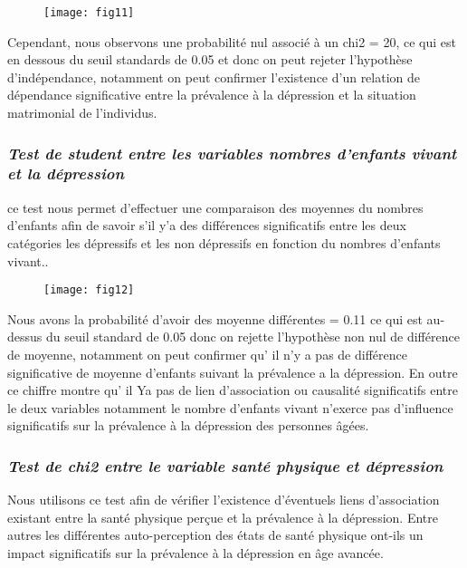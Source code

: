 \documentclass[a4paper]{article}
\begin{document}
\begin{figure}[h!]
	\centering
	\texttt{[image: fig11]}
	\caption{}
	\label{fig:fig11}
\end{figure}

Cependant, nous observons une probabilité nul associé à un chi2 = 20, ce qui est en dessous du seuil standards de 0.05 et donc on peut rejeter l'hypothèse d'indépendance, notamment on peut confirmer l’existence d’un relation de dépendance significative entre la prévalence à la dépression et la situation matrimonial de l’individus.

\subsubsection{\textit{Test de student entre les variables nombres d’enfants vivant et la dépression}}

ce test nous permet d’effectuer une comparaison des  moyennes du nombres d’enfants afin de savoir s’il y’a des différences significatifs entre les deux catégories les dépressifs et les non dépressifs en fonction du nombres d’enfants vivant.. 

\begin{figure}[h!]
	\centering
	\texttt{[image: fig12]}
	\caption{}
	\label{fig:fig12}
\end{figure}

Nous avons la probabilité  d’avoir des moyenne différentes = 0.11 ce qui est au-dessus du seuil standard de 0.05 donc on rejette l'hypothèse non nul de différence de moyenne, notamment on peut confirmer qu' il n'y a pas de différence significative de moyenne d’enfants suivant la prévalence a la dépression. En outre ce chiffre montre qu' il Ya pas de lien d'association ou causalité significatifs entre le deux variables notamment le nombre d’enfants vivant n'exerce pas d'influence significatifs sur la prévalence à la dépression des personnes âgées.

\subsubsection{\textit{Test de chi2 entre le variable santé physique et dépression}}

Nous utilisons ce test afin de vérifier l'existence d'éventuels liens d’association existant entre la santé physique perçue et la prévalence à la dépression. Entre autres les différentes auto-perception des états de santé physique ont-ils un impact significatifs sur la prévalence à la dépression en âge avancée.
\end{document}
